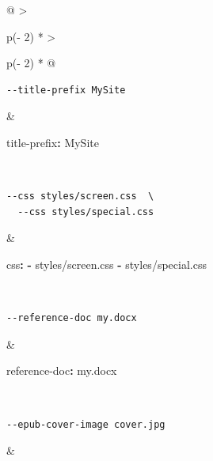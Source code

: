 \documentclass[
]{article}
\newenvironment{Shaded}{}{}
\newcommand{\AttributeTok}[1]{\textcolor[rgb]{0.49,0.56,0.16}{#1}}
\newcommand{\FunctionTok}[1]{\textcolor[rgb]{0.02,0.16,0.49}{#1}}
\newcommand{\KeywordTok}[1]{\textcolor[rgb]{0.00,0.44,0.13}{\textbf{#1}}}
\begin{document}
\begin{longtable}[]{@{}
  >{\raggedright\arraybackslash}p{(\columnwidth - 2\tabcolsep) * }
  >{\raggedright\arraybackslash}p{(\columnwidth - 2\tabcolsep) * }@{}}
\begin{minipage}[t]{\linewidth}
\begin{verbatim}
--title-prefix MySite
\end{verbatim}
\end{minipage} & \begin{minipage}[t]{\linewidth}\raggedright
\begin{Shaded}
\begin{Highlighting}[]
\FunctionTok{title{-}prefix}\KeywordTok{:}\AttributeTok{ MySite}
\end{Highlighting}
\end{Shaded}
\end{minipage} \\
\begin{minipage}[t]{\linewidth}\raggedright
\begin{verbatim}
--css styles/screen.css  \
  --css styles/special.css
\end{verbatim}
\end{minipage} & \begin{minipage}[t]{\linewidth}\raggedright
\begin{Shaded}
\begin{Highlighting}[]
\FunctionTok{css}\KeywordTok{:}
\AttributeTok{  }\KeywordTok{{-}}\AttributeTok{ styles/screen.css}
\AttributeTok{  }\KeywordTok{{-}}\AttributeTok{ styles/special.css}
\end{Highlighting}
\end{Shaded}
\end{minipage} \\
\begin{minipage}[t]{\linewidth}\raggedright
\begin{verbatim}
--reference-doc my.docx
\end{verbatim}
\end{minipage} & \begin{minipage}[t]{\linewidth}\raggedright
\begin{Shaded}
\begin{Highlighting}[]
\FunctionTok{reference{-}doc}\KeywordTok{:}\AttributeTok{ my.docx}
\end{Highlighting}
\end{Shaded}
\end{minipage} \\
\begin{minipage}[t]{\linewidth}\raggedright
\begin{verbatim}
--epub-cover-image cover.jpg
\end{verbatim}
\end{minipage} & \begin{minipage}[t]{\linewidth}\raggedright

\end{minipage}
\end{longtable}
\end{document}
